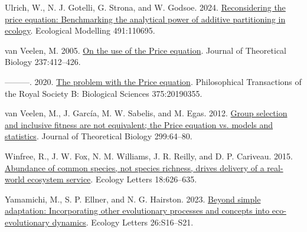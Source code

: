 \documentclass[
]{article}
\newlength{\cslhangindent}
\newenvironment{CSLReferences}[2] %
 {\begin{list}{}{%
  \setlength{\itemindent}{0pt}
  \setlength{\leftmargin}{0pt}
  \setlength{\parsep}{0pt}
  \ifodd #1
   \setlength{\leftmargin}{\cslhangindent}
   \setlength{\itemindent}{-1\cslhangindent}
  \fi
  \setlength{\itemsep}{#2\baselineskip}}}
 {\end{list}}
\begin{document}
\begin{CSLReferences}{0}{0}
Ulrich, W., N. J. Gotelli, G. Strona, and W. Godsoe. 2024.
\href{https://doi.org/10.1016/j.ecolmodel.2024.110695}{Reconsidering the
price equation: Benchmarking the analytical power of additive
partitioning in ecology}. Ecological Modelling 491:110695.

van Veelen, M. 2005.
\href{https://doi.org/10.1016/j.jtbi.2005.04.026}{{On the use of the
Price equation}}. Journal of Theoretical Biology 237:412--426.

---------. 2020. \href{https://doi.org/10.1098/rstb.2019.0355}{{The
problem with the Price equation}}. Philosophical Transactions of the
Royal Society B: Biological Sciences 375:20190355.

van Veelen, M., J. García, M. W. Sabelis, and M. Egas. 2012.
\href{https://doi.org/10.1016/j.jtbi.2011.07.025}{{Group selection and
inclusive fitness are not equivalent; the Price equation vs. models and
statistics}}. Journal of Theoretical Biology 299:64--80.

Winfree, R., J. W. Fox, N. M. Williams, J. R. Reilly, and D. P.
Cariveau. 2015. \href{https://doi.org/10.1111/ele.12424}{{Abundance of
common species, not species richness, drives delivery of a real-world
ecosystem service}}. Ecology Letters 18:626--635.

Yamamichi, M., S. P. Ellner, and N. G. Hairston. 2023.
\href{https://doi.org/10.1111/ele.14197}{Beyond simple adaptation:
Incorporating other evolutionary processes and concepts into
eco-evolutionary dynamics}. Ecology Letters 26:S16--S21.

\end{CSLReferences}
\end{document}
